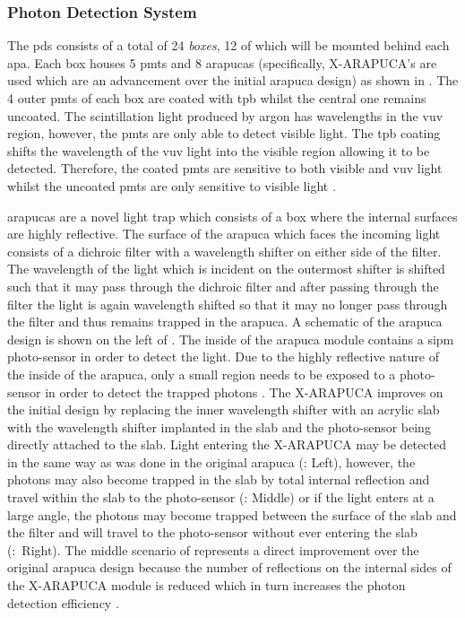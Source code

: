 \subsubsection*{Photon Detection System}
The \gls{pds} consists of a total of 24 \textit{boxes}, 12 of which will be mounted behind each \gls{apa}. Each box houses 5 \glspl{pmt} and 8 \glspl{arapuca} (specifically, X-ARAPUCA's are used which are an advancement over the initial \gls{arapuca} design) as shown in . The 4 outer \glspl{pmt} of each box are coated with \gls{tpb} whilst the central one remains uncoated. The scintillation light produced by argon has wavelengths in the \gls{vuv} region, however, the \glspl{pmt} are only able to detect visible light. The \gls{tpb} coating shifts the wavelength of the \gls{vuv} light into the visible region allowing it to be detected. Therefore, the coated \glspl{pmt} are sensitive to both visible and \gls{vuv} light whilst the uncoated \glspl{pmt} are only sensitive to visible light \cite{LArTPC_review}. 

\glspl{arapuca} are a novel light trap which consists of a box where the internal surfaces are highly reflective. The surface of the \gls{arapuca} which faces the incoming light consists of a dichroic filter with a wavelength shifter on either side of the filter. The wavelength of the light which is incident on the outermost shifter is shifted such that it may pass through the dichroic filter and after passing through the filter the light is again wavelength shifted so that it may no longer pass through the filter and thus remains trapped in the \gls{arapuca}. A schematic of the \gls{arapuca} design is shown on the left of . The inside of the \gls{arapuca} module contains a \gls{sipm} photo-sensor in order to detect the light. Due to the highly reflective nature of the inside of the \gls{arapuca}, only a small region needs to be exposed to a photo-sensor in order to detect the trapped photons \cite{ARAPUCA}. The X-ARAPUCA improves on the initial design by replacing the inner wavelength shifter with an acrylic slab with the wavelength shifter implanted in the slab and the photo-sensor being directly attached to the slab. Light entering the X-ARAPUCA may be detected in the same way as was done in the original \gls{arapuca} (: Left), however, the photons may also become trapped in the slab by total internal reflection and travel within the slab to the photo-sensor (: Middle) or if the light enters at a large angle, the photons may become trapped between the surface of the slab and the filter and will travel to the photo-sensor without ever entering the slab (:~Right). The middle scenario of  represents a direct improvement over the original \gls{arapuca} design because the number of reflections on the internal sides of the X-ARAPUCA module is reduced which in turn increases the photon detection efficiency \cite{X-ARAPUCA}. 

